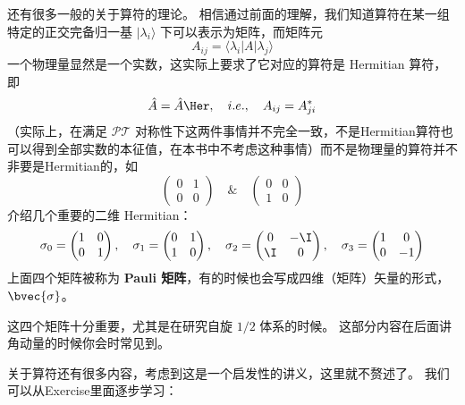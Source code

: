 还有很多一般的关于算符的理论。 相信通过前面的理解，我们知道算符在某一组特定的正交完备归一基 $|\lambda_i\rangle$ 下可以表示为矩阵，而矩阵元
\begin{equation}
A_{ij} = \langle\lambda_i|A|\lambda_j\rangle
\end{equation}
一个物理量显然是一个实数，这实际上要求了它对应的算符是 Hermitian 算符，即
\begin{equation}
\hat{A} = \hat{A}\Her,\quad i.e.,\quad A_{ij} = A_{ji}^*
\end{equation}
（实际上，在满足 $\mathcal{PT}$ 对称性下这两件事情并不完全一致，不是Hermitian算符也可以得到全部实数的本征值，在本书中不考虑这种事情）而不是物理量的算符并不非要是Hermitian的，如
\begin{equation}
\left(\begin{matrix}0 & 1\\0 & 0\end{matrix}\right) \quad \& \quad \left(\begin{matrix}0 & 0\\1 & 0\end{matrix}\right)
\end{equation}
介绍几个重要的二维 Hermitian：
\begin{equation}\label{eq_Basics_18}
\sigma_0 = \left(\begin{matrix}1 & 0\\0 & 1\end{matrix}\right),
\quad\sigma_1 = \left(\begin{matrix} 0 & 1\\1 & 0\end{matrix}\right),
\quad\sigma_2 = \left(\begin{matrix} 0 & -\I\\ \I & 0\end{matrix}\right),
\quad\sigma_3 = \left(\begin{matrix} 1 & 0\\0 & -1\end{matrix}\right)  
\end{equation}
上面四个矩阵被称为 \textbf{Pauli 矩阵}，有的时候也会写成四维（矩阵）矢量的形式，$\bvec{\sigma}$。

这四个矩阵十分重要，尤其是在研究自旋 $1/2$ 体系的时候。 这部分内容在后面讲角动量的时候你会时常见到。

关于算符还有很多内容，考虑到这是一个启发性的讲义，这里就不赘述了。 我们可以从Exercise里面逐步学习：

